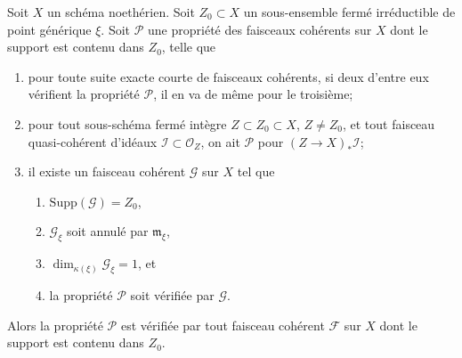 \begin{lemma}
\label{lemma-property-irreducible}
Soit $X$ un schéma noethérien. Soit $Z_0 \subset X$ un sous-ensemble fermé irréductible
de point générique $\xi$. Soit $\mathcal{P}$ une propriété des faisceaux cohérents
sur $X$ dont le support est contenu dans $Z_0$, telle que
\begin{enumerate}
\item pour toute suite exacte courte de faisceaux cohérents, si deux
d'entre eux vérifient la propriété $\mathcal{P}$, il en va de même pour le
troisième;

\item pour tout sous-schéma fermé intègre $Z \subset Z_0 \subset X$,
$Z \not = Z_0$, et tout faisceau quasi-cohérent d'idéaux
$\mathcal{I} \subset \mathcal{O}_Z$, on ait
$\mathcal{P}$ pour $(Z \to X)_*\mathcal{I}$;
\item il existe un faisceau cohérent $\mathcal{G}$ sur $X$ tel que
\begin{enumerate}
\item $\text{Supp}(\mathcal{G}) = Z_0$,
\item $\mathcal{G}_\xi$ soit annulé par $\mathfrak m_\xi$,
\item $\dim_{\kappa(\xi)} \mathcal{G}_\xi = 1$, et
\item la propriété $\mathcal{P}$ soit vérifiée par $\mathcal{G}$.
\end{enumerate}
\end{enumerate}
Alors la propriété $\mathcal{P}$ est vérifiée par tout faisceau cohérent
$\mathcal{F}$ sur $X$ dont le support est contenu dans $Z_0$.
\end{lemma}

